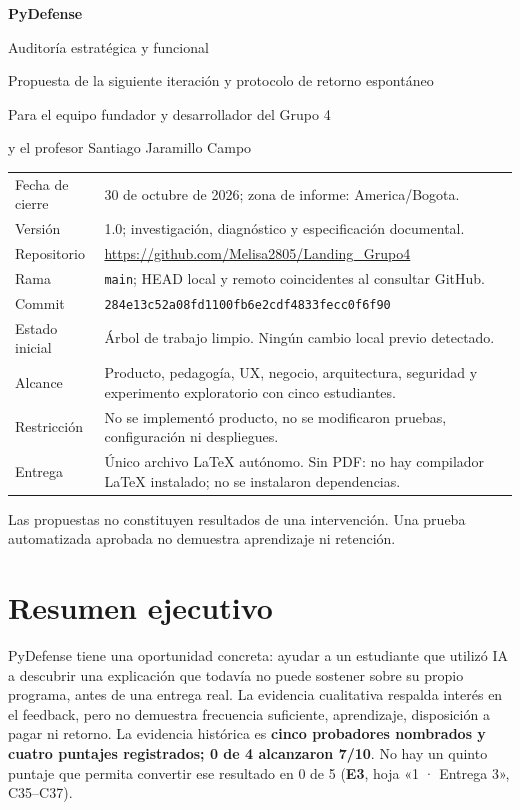 \documentclass[11pt,a4paper]{report}
\newcommand{\xl}[3]{\textbf{#1}, hoja «#2», #3}
\begin{document}
\begin{titlepage}
\centering
\vspace*{1.5cm}
{\Huge\bfseries PyDefense\par}
\vspace{0.7cm}
{\LARGE Auditoría estratégica y funcional\par}
\vspace{0.4cm}
{\Large Propuesta de la siguiente iteración y protocolo de retorno espontáneo\par}
\vspace{1.5cm}
{\large Para el equipo fundador y desarrollador del Grupo 4\par}
{\large y el profesor Santiago Jaramillo Campo\par}
\vfill
\begin{tabular}{P{3.2cm}P{11cm}}
Fecha de cierre & 30 de octubre de 2026; zona de informe: America/Bogota.\\
Versión & 1.0; investigación, diagnóstico y especificación documental.\\
Repositorio & \url{https://github.com/Melisa2805/Landing_Grupo4}\\
Rama & \texttt{main}; HEAD local y remoto coincidentes al consultar GitHub.\\
Commit & \nolinkurl{284e13c52a08fd1100fb6e2cdf4833fecc0f6f90}\\
Estado inicial & Árbol de trabajo limpio. Ningún cambio local previo detectado.\\
Alcance & Producto, pedagogía, UX, negocio, arquitectura, seguridad y experimento exploratorio con cinco estudiantes.\\
Restricción & No se implementó producto, no se modificaron pruebas, configuración ni despliegues.\\
Entrega & Único archivo LaTeX autónomo. Sin PDF: no hay compilador LaTeX instalado; no se instalaron dependencias.\\
\end{tabular}
\vfill
{\small Las propuestas no constituyen resultados de una intervención. Una prueba automatizada aprobada no demuestra aprendizaje ni retención.}
\end{titlepage}
\tableofcontents

\chapter{Resumen ejecutivo}
\label{ch:resumen}
PyDefense tiene una oportunidad concreta: ayudar a un estudiante que utilizó IA a descubrir una explicación que todavía no puede sostener sobre su propio programa, antes de una entrega real. La evidencia cualitativa respalda interés en el feedback, pero no demuestra frecuencia suficiente, aprendizaje, disposición a pagar ni retorno. La evidencia histórica es \textbf{cinco probadores nombrados y cuatro puntajes registrados; 0 de 4 alcanzaron 7/10}. No hay un quinto puntaje que permita convertir ese resultado en 0 de 5 (\xl{E3}{1 · Entrega 3}{C35--C37}).
\end{document}
